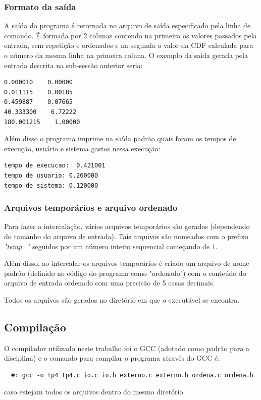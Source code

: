 \documentclass[12pt]{article}
\begin{document}
\subsubsection{Formato da saída}
A saída do programa é retornada no arquivo de saída especificado pela linha de comando.
É formada por 2 colunas contendo na primeira os valores passados pela entrada, sem repetição
e ordenados e na segunda o valor da CDF calculada para o número da mesma linha na primeira 
coluna. O exemplo da saída gerada pela entrada descrita na sub-sessão anterior seria:
\begin{verbatim}
0.000010    0.00000
0.011115    0.00185
0.459887    0.07665
40.333300    6.72222
180.001215    1.00000
\end{verbatim}

Além disso o programa imprime na saída padrão quais foram os tempos de execução, usuário e sistema
gastos nessa execução:
\begin{verbatim}
tempo de execucao:  0.421001
tempo de usuario: 0.260000
tempo de sistema: 0.120000
\end{verbatim}

\subsubsection{Arquivos temporários e arquivo ordenado}
Para fazer a intercalação, vários arquivos temporários são gerados (dependendo do tamanho do arquivo
de entrada). Tais arquivos são nomeados com o prefixo \textit{"temp\_"} seguidos por um número inteiro
sequencial começando de $1$.

Além disso, ao intercalar os arquivos temporários é criado um arquivo de nome padrão (definido no código
do programa como "ordenado") com o conteúdo do arquivo de entrada ordenado com uma precisão de 5 casas decimais.

Todos os arquivos são gerados no diretório em que o executável se encontra.

\subsection{Compilação}
O compilador utilizado neste trabalho foi o GCC (adotado como padrão para a disciplina) e 
o comando para compilar o programa através do GCC é:
\begin{verbatim}
  #: gcc -o tp4 tp4.c io.c io.h externo.c externo.h ordena.c ordena.h
\end{verbatim}
caso estejam todos os arquivos dentro do mesmo diretório.
\end{document}

